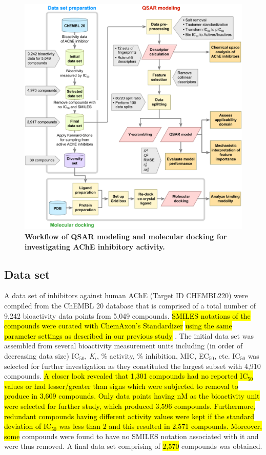 \documentclass[fleqn,10pt]{wlpeerj}
\begin{document}
\begin{figure}[!b]
\centering
\includegraphics[width = \linewidth]{Fig_Workflow_Revision}
\caption{\textbf{Workflow of QSAR modeling and molecular docking for investigating AChE inhibitory activity.}} 
\label{fig:workflow} 
\end{figure}


\subsection*{Data set}

A data set of inhibitors against human AChE (Target ID CHEMBL220) were compiled from the ChEMBL 20 database \citep{gaulton2012chembl} that is comprised of a total number of 9,242 bioactivity data points from 5,049 compounds. \hl{SMILES notations of the compounds were curated with ChemAxon's Standardizer} \citep{standardizer} \hl{using the same parameter settings as described in our previous study} \citep{simeon2016unraveling}. The initial data set was assembled from several bioactivity measurement units including (in order of decreasing data size) IC$_{50}$, \textit{K}$_i$, \% activity, \% inhibition, MIC, EC$_{50}$, etc. IC$_{50}$ was selected for further investigation as they constituted the largest subset with 4,910 compounds. \hl{A closer look revealed that 1,301 compounds had no reported IC$_{50}$ values or had lesser/greater than signs which were subjected to removal to produce in 3,609 compounds. Only data points having nM as the bioactivity unit were selected for further study, which produced 3,596 compounds. Furthermore, redundant compounds having different activity values were kept if the standard deviation of IC$_{50}$ was less than 2 and this resulted in 2,571 compounds. Moreover, some} compounds were found to have no SMILES notation associated with it and were thus removed. A final data set comprising of \hl{2,570} compounds was obtained.
\end{document}
